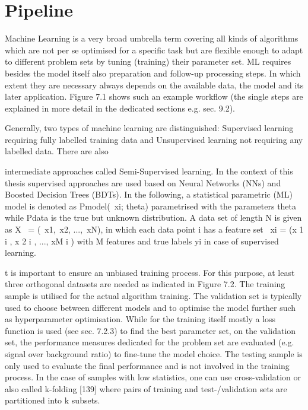\section{Pipeline}

Machine Learning is a very broad umbrella term covering all kinds of algorithms which are not per
se optimised for a specific task but are flexible enough to adapt to different problem sets by tuning
(training) their parameter set.
ML requires besides the model itself also preparation and follow-up processing steps. In which
extent they are necessary always depends on the available data, the model and its later application.
Figure 7.1 shows such an example workflow (the single steps are explained in more detail in the
dedicated sections e.g. sec. 9.2).

Generally, two types of machine learning are distinguished: Supervised learning requiring fully
labelled training data and Unsupervised learning not requiring any labelled data. There are also

intermediate approaches called Semi-Supervised learning. In the context of this thesis supervised
approaches are used based on Neural Networks (NNs) and Boosted Decision Trees (BDTs).
In the following, a statistical parametric (ML) model is denoted as Pmodel(~xi; theta) parametrised with
the parameters theta while Pdata is the true but unknown distribution. A data set of length N is given
as X~ = (~x1,~x2, ...,~xN), in which each data point i has a feature set ~xi = (x
1
i
, x
2
i
, ..., xM
i
) with M
features and true labels yi in case of supervised learning.

t is important to ensure an unbiased training process. For this purpose, at least three orthogonal
datasets are needed as indicated in Figure 7.2. The training sample is utilised for the actual algorithm
training. The validation set is typically used to choose between different models and to optimise
the model further such as hyperparameter optimisation. While for the training itself mostly a loss
function is used (see sec. 7.2.3) to find the best parameter set, on the validation set, the performance
measures dedicated for the problem set are evaluated (e.g. signal over background ratio) to fine-tune
the model choice. The testing sample is only used to evaluate the final performance and is not involved in the training process. In the case of samples with low statistics, one can use cross-validation
or also called k-folding [139] where pairs of training and test-/validation sets are partitioned into k
subsets.

